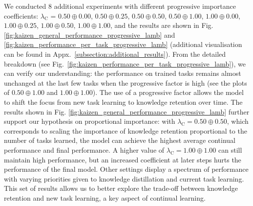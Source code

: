 We conducted 8 additional experiments with different progressive importance coefficients: $\lambda_{\mathrm{C}}$ = $0.50 \oplus 0.00$, $0.50 \oplus 0.25$, $0.50 \oplus 0.50$, $0.50 \oplus 1.00$, $1.00 \oplus 0.00$, $1.00 \oplus 0.25$, $1.00 \oplus 0.50$, $1.00 \oplus 1.00$, and the results are shown in Fig.~
 \ref{fig:kaizen_general_performance_progressive_lamb} and \ref{fig:kaizen_performance_per_task_progressive_lamb} (additional visualisation can be found in Appx.~\ref{subsection:additional_results}).
From the detailed breakdown (see Fig.~\ref{fig:kaizen_performance_per_task_progressive_lamb}), we can verify our understanding: the performance on trained tasks remains almost unchanged at the last few tasks when the progressive factor is high (see the plots of $0.50 \oplus 1.00$ and $1.00 \oplus 1.00$). The use of a progressive factor allows the model to shift the focus from new task learning to knowledge retention over time. The results shown in Fig. \ref{fig:kaizen_general_performance_progressive_lamb} further support our hypothesis on proportional importance: with $\lambda_{\mathrm{C}}=0.50 \oplus 0.50$, which corresponds to scaling the importance of knowledge retention proportional to the number of tasks learned, the model can achieve the highest average continual performance and final performance. A higher value of $\lambda_{\mathrm{C}}=1.00 \oplus 1.00$ can still maintain high performance, but an increased coefficient at later steps hurts the performance of the final model. Other settings display a spectrum of performance with varying priorities given to knowledge distillation and current task learning. This set of results allows us to better explore the trade-off between knowledge retention and new task learning, a key aspect of continual learning.

